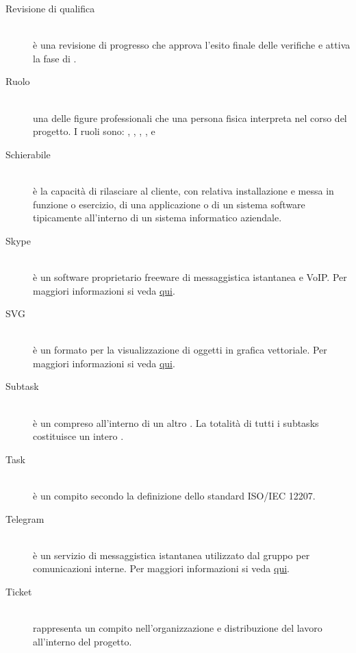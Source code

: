 \documentclass[12pt,a4paper]{article}
\begin{document}
\begin{description}
\item[Revisione di qualifica] 
\hfill\\è una revisione di progresso che approva l'esito finale delle verifiche e attiva la fase di .

\item[Ruolo] 
\hfill\\una delle figure professionali che una persona fisica interpreta nel corso del progetto. I ruoli sono: , , , ,  e 

\item[Schierabile] 
\hfill\\è la capacità di rilasciare al cliente, con relativa installazione e messa in funzione o esercizio, di una applicazione o di un sistema software tipicamente all'interno di un sistema informatico aziendale.

\item[Skype] 
\hfill\\è un software proprietario freeware di messaggistica istantanea e VoIP. Per maggiori informazioni si veda \href{https://it.wikipedia.org/wiki/Skype}{qui}.

\item[SVG] 
\hfill\\è un formato per la visualizzazione di oggetti in grafica vettoriale. Per maggiori informazioni si veda \href{https://it.wikipedia.org/wiki/Scalable_Vector_Graphics}{qui}.

\item[Subtask] 
\hfill\\è un  compreso all'interno di un altro . La totalità di tutti i subtasks costituisce un intero .

\item[Task] 
\hfill\\è un compito secondo la definizione dello standard ISO/IEC 12207.

\item[Telegram] 
\hfill\\è un servizio di messaggistica istantanea utilizzato dal gruppo per comunicazioni interne. Per maggiori informazioni si veda \href{https://it.wikipedia.org/wiki/Telegram_(software)}{qui}.

\item[Ticket] 
\hfill\\rappresenta un compito nell'organizzazione e distribuzione del lavoro all'interno del progetto.


\end{description}
\end{document}
